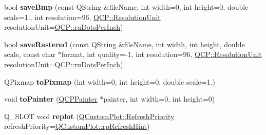 \begin{DoxyCompactItemize}
\item 
\mbox{\label{class_q_custom_plot_ae3a86ed0795670e50afa21759d4fa13d}} 
bool {\bfseries save\+Bmp} (const Q\+String \&file\+Name, int width=0, int height=0, double scale=1., int resolution=96, \hyperlink{namespace_q_c_p_a715d46153da230990aa887d0f0602452}{Q\+C\+P\+::\+Resolution\+Unit} resolution\+Unit=\hyperlink{namespace_q_c_p_a715d46153da230990aa887d0f0602452a9def6fd83de9b4108ad999541a42ac6a}{Q\+C\+P\+::ru\+Dots\+Per\+Inch})
\item 
\mbox{\label{class_q_custom_plot_ad7723ce2edfa270632ef42b03a444352}} 
bool {\bfseries save\+Rastered} (const Q\+String \&file\+Name, int width, int height, double scale, const char $\ast$format, int quality=-\/1, int resolution=96, \hyperlink{namespace_q_c_p_a715d46153da230990aa887d0f0602452}{Q\+C\+P\+::\+Resolution\+Unit} resolution\+Unit=\hyperlink{namespace_q_c_p_a715d46153da230990aa887d0f0602452a9def6fd83de9b4108ad999541a42ac6a}{Q\+C\+P\+::ru\+Dots\+Per\+Inch})
\item 
\mbox{\label{class_q_custom_plot_aabb974d71ce96c137dc04eb6eab844fe}} 
Q\+Pixmap {\bfseries to\+Pixmap} (int width=0, int height=0, double scale=1.)
\item 
\mbox{\label{class_q_custom_plot_a1be68d5c0f1e086d6374d1340a193fb9}} 
void {\bfseries to\+Painter} (\hyperlink{class_q_c_p_painter}{Q\+C\+P\+Painter} $\ast$painter, int width=0, int height=0)
\item 
\mbox{\label{class_q_custom_plot_a924548f2f315d94811af92704340e15a}} 
Q\+\_\+\+S\+L\+OT void {\bfseries replot} (\hyperlink{class_q_custom_plot_a45d61392d13042e712a956d27762aa39}{Q\+Custom\+Plot\+::\+Refresh\+Priority} refresh\+Priority=\hyperlink{class_q_custom_plot_a45d61392d13042e712a956d27762aa39a5349b4ed6366760e34653bc54613a5ad}{Q\+Custom\+Plot\+::rp\+Refresh\+Hint})
\end{DoxyCompactItemize}
